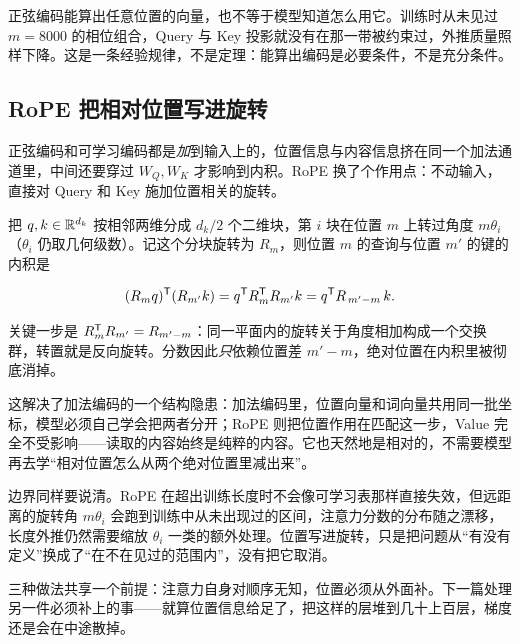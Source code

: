 正弦编码能算出任意位置的向量，也不等于模型知道怎么用它。训练时从未见过 \(m=8000\) 的相位组合，Query 与 Key 投影就没有在那一带被约束过，外推质量照样下降。这是一条经验规律，不是定理：能算出编码是必要条件，不是充分条件。

\subsection{RoPE 把相对位置写进旋转}

正弦编码和可学习编码都是\emph{加}到输入上的，位置信息与内容信息挤在同一个加法通道里，中间还要穿过 \(W_Q,W_K\) 才影响到内积。RoPE 换了个作用点：不动输入，直接对 Query 和 Key 施加位置相关的旋转。

把 \(q,k\in\mathbb{R}^{d_k}\) 按相邻两维分成 \(d_k/2\) 个二维块，第 \(i\) 块在位置 \(m\) 上转过角度 \(m\theta_i\)（\(\theta_i\) 仍取几何级数）。记这个分块旋转为 \(R_m\)，则位置 \(m\) 的查询与位置 \(m'\) 的键的内积是

\[
(R_m q)^{\mathsf{T}}(R_{m'} k) = q^{\mathsf{T}}R_m^{\mathsf{T}}R_{m'} k = q^{\mathsf{T}}R_{\,m'-m}\,k .
\]

关键一步是 \(R_m^{\mathsf{T}}R_{m'}=R_{m'-m}\)：同一平面内的旋转关于角度相加构成一个交换群，转置就是反向旋转。分数因此\emph{只}依赖位置差 \(m'-m\)，绝对位置在内积里被彻底消掉。

这解决了加法编码的一个结构隐患：加法编码里，位置向量和词向量共用同一批坐标，模型必须自己学会把两者分开；RoPE 则把位置作用在匹配这一步，Value 完全不受影响——读取的内容始终是纯粹的内容。它也天然地是相对的，不需要模型再去学``相对位置怎么从两个绝对位置里减出来''。

边界同样要说清。RoPE 在超出训练长度时不会像可学习表那样直接失效，但远距离的旋转角 \(m\theta_i\) 会跑到训练中从未出现过的区间，注意力分数的分布随之漂移，长度外推仍然需要缩放 \(\theta_i\) 一类的额外处理。位置写进旋转，只是把问题从``有没有定义''换成了``在不在见过的范围内''，没有把它取消。

三种做法共享一个前提：注意力自身对顺序无知，位置必须从外面补。下一篇处理另一件必须补上的事——就算位置信息给足了，把这样的层堆到几十上百层，梯度还是会在中途散掉。
